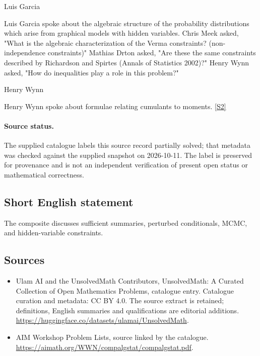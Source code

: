 \documentclass[11pt]{article}
\newcommand{\sref}[2]{\hyperlink{source:#1:#2}{[S#2]}}
\begin{document}
Luis Garcia

Luis Garcia spoke about the algebraic structure of the probability distributions which arise from graphical models with hidden variables. Chris Meek asked, "What is the algebraic characterization of the Verma constraints? (non-independence constraints)" Mathias Drton asked, "Are these the same constraints described by Richardson and Spirtes (Annals of Statistics 2002)?" Henry Wynn asked, "How do inequalities play a role in this problem?"

Henry Wynn

Henry Wynn spoke about formulae relating cumulants to moments. \sref{statement}{2}
\paragraph{Source status.}
The supplied catalogue labels this source record partially solved; that metadata was checked against the supplied snapshot on 2026-10-11. The label is preserved for provenance and is not an independent verification of present open status or mathematical correctness.
\subsection{Short English statement}
The composite discusses sufficient summaries, perturbed conditionals, MCMC, and hidden-variable constraints.
\subsection{Sources}
\begin{itemize}
\item[\hypertarget{source:statement:1}{S1}] Ulam AI and the UnsolvedMath Contributors, UnsolvedMath: A Curated Collection of Open Mathematics Problems, catalogue entry. Catalogue curation and metadata: CC BY 4.0. The source extract is retained; definitions, English summaries and qualifications are editorial additions.
\url{https://huggingface.co/datasets/ulamai/UnsolvedMath}.
\item[\hypertarget{source:statement:2}{S2}] AIM Workshop Problem Lists, source linked by the catalogue.
\url{https://aimath.org/WWN/compalgstat/compalgstat.pdf}.
\end{itemize}
\end{document}

